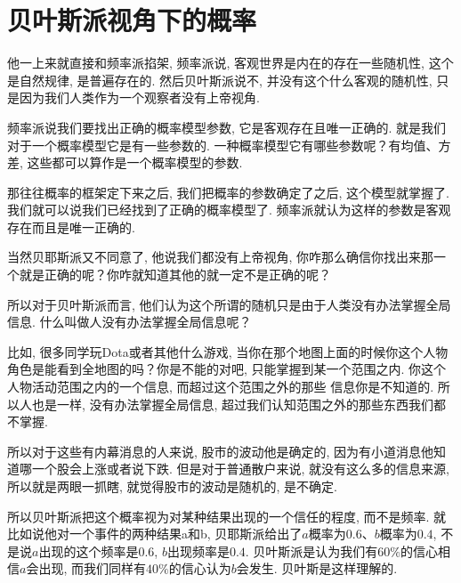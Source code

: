 \section{贝叶斯派视角下的概率}

他一上来就直接和频率派掐架, 频率派说, 客观世界是内在的存在一些随机性, 这个是自然规律, 是普遍存在的. 然后贝叶斯派说不, 并没有这个什么客观的随机性, 只是因为我们人类作为一个观察者没有上帝视角. 

频率派说我们要找出正确的概率模型参数, 它是客观存在且唯一正确的. 就是我们对于一个概率模型它是有一些参数的. 一种概率模型它有哪些参数呢？有均值、方差, 这些都可以算作是一个概率模型的参数. 

那往往概率的框架定下来之后, 我们把概率的参数确定了之后, 这个模型就掌握了. 我们就可以说我们已经找到了正确的概率模型了. 频率派就认为这样的参数是客观存在而且是唯一正确的. 

当然贝耶斯派又不同意了, 他说我们都没有上帝视角, 你咋那么确信你找出来那一个就是正确的呢？你咋就知道其他的就一定不是正确的呢？

所以对于贝叶斯派而言, 他们认为这个所谓的随机只是由于人类没有办法掌握全局信息. 什么叫做人没有办法掌握全局信息呢？

比如, 很多同学玩Dota或者其他什么游戏, 当你在那个地图上面的时候你这个人物角色是能看到全地图的吗？你是不能的对吧, 只能掌握到某一个范围之内. 你这个人物活动范围之内的一个信息, 而超过这个范围之外的那些
信息你是不知道的. 所以人也是一样, 没有办法掌握全局信息, 超过我们认知范围之外的那些东西我们都不掌握. 

所以对于这些有内幕消息的人来说, 股市的波动他是确定的, 因为有小道消息他知道哪一个股会上涨或者说下跌. 但是对于普通散户来说, 就没有这么多的信息来源, 所以就是两眼一抓瞎, 就觉得股市的波动是随机的, 是不确定. 

所以贝叶斯派把这个概率视为对某种结果出现的一个信任的程度, 而不是频率. 就比如说他对一个事件的两种结果a和b, 贝耶斯派给出了$a$概率为$0.6$、$b$概率为$0.4$, 不是说$a$出现的这个频率是$0.6$, $b$出现频率是$0.4$. 贝叶斯派是认为我们有$60\%$的信心相信$a$会出现, 而我们同样有$40\%$的信心认为$b$会发生. 贝叶斯是这样理解的. 

